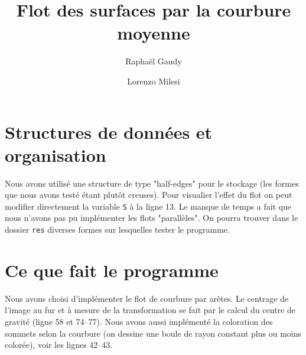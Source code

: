 \documentclass[11pt]{article} %
\title{Flot des surfaces par la courbure moyenne}
\author{Raphaël Gaudy \and Lorenzo Milesi}
\begin{document}
\maketitle

\section{Structures de données et organisation}

Nous avons utilisé une structure de type "half-edges" pour le stockage (les formes que nous avons testé 
étant plutôt creuses). Pour visualier l'effet du flot on peut modifier directement la variable
\texttt{S} à la ligne 13. Le manque de temps a fait que nous n'avons pas pu implémenter 
les flots "parallèles". On pourra trouver dans le dossier \texttt{res} diverses formes sur lesquelles tester
le programme.

\section{Ce que fait le programme}
Nous avons choisi d'implémenter le flot de courbure par arêtes. Le centrage de l'image au fur et à mesure de la transformation
se fait par le calcul du centre de gravité (ligne 58 et 74--77). Nous avons aussi implémenté 
la coloration des sommets selon la courbure (on dessine une boule de rayon constant plus ou moins colorée), voir les lignes 42--43.
\end{document}
